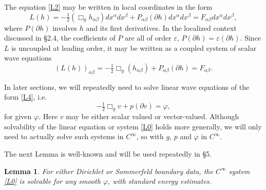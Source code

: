 \documentclass[10pt]{amsart}
\renewcommand{\a}{\alpha}
\renewcommand{\b}{\beta}
\newcommand{\e}{\varepsilon}
\newcommand{\f}{\varphi}
\newcommand{\be}{\begin{equation}}
\newcommand{\ee}{\end{equation}}
\newcommand{\p}{\partial}
\newcommand{\<}{\langle}
\renewcommand{\>}{\rangle}
\theoremstyle{plain}
\newtheorem{lemma}{Lemma}[section]
\theoremstyle{remark}
\theoremstyle{definition}
\numberwithin{equation}{section}
\begin{document}
  The equation \eqref{L2} may be written in local coordinates in the form 
$$L(h) = -\tfrac{1}{2}(\Box_g h_{\a\b})dx^{\a}dx^{\b} + P_{\a\b}(\p h)dx^{\a}dx^{\b} = F_{\a\b}dx^{\a}dx^{\b},$$
where $P(\p h)$ involves $h$ and its first derivatives. In the localized context discussed in \S 2.4, the coefficients of $P$ are 
all of order $\e$, $P(\p h) = \e(\p h)$. Since $L$ is uncoupled at leading order, it may be written as a coupled system of scalar 
wave equations 
 \be \label{L4}
(L(h))_{\a\b} = -\tfrac{1}{2} \Box_g (h_{\a\b}) + P_{\a\b}(\p h) = F_{\a\b}. 
\ee

  In later sections, we will repeatedly need to solve linear wave equations of the form \eqref{L4}, i.e. 
\be \label{L0}
-\tfrac{1}{2}\Box_g v + p(\p v)  = \f,
\ee
for given $\f$. Here $v$ may be either scalar valued or vector-valued. Although solvability of the linear equation 
or system \eqref{L0} holds more generally, we will only need to actually solve such systems in $C^{\infty}$, so with $g$, $p$ and 
$\f$ in $C^{\infty}$. 

 The next Lemma is well-known and will be used repeatedly in \S 5. 

\begin{lemma} \label{DirSomm}
For either Dirichlet or Sommerfeld boundary data, the $C^{\infty}$ system \eqref{L0} is solvable for any smooth $\f$, with standard energy estimates. 
\end{lemma}
\end{document}
